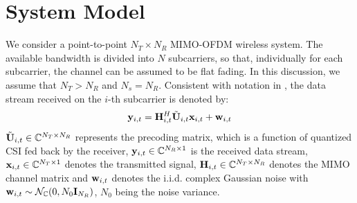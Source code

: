 \documentclass[conference]{IEEEtran}
\begin{document}
\section{System Model}
\label{section2}
\noindent We consider a point-to-point $N_T\times N_R$ MIMO-OFDM wireless system.
The available bandwidth is divided into $N$ subcarriers, so that, individually for each subcarrier, the channel can be assumed to be flat fading. In this discussion, we assume that $N_T > N_R$ and $N_s = N_R$. Consistent with notation in \cite{6891198,Gupt1905:Predictive}, the data stream received on the $i$-th subcarrier is denoted by:
\begin{equation}
{\bf y}_{i,t}={\bf H}^{H}_{i,t}\tilde{{\bf U}}_{i,t}{\bf x}_{i,t}+ {\bf w}_{i,t}
\end{equation}
$\tilde{{\bf U}}_{i,t} \in \mathbb{C}^{N_T \times N_R}$ represents the precoding matrix, which is a function of quantized CSI fed back by the receiver, ${\bf y}_{i,t} \in \mathbb{C}^{N_R \times 1}$ is the received data stream, ${\bf x}_{i,t} \in \mathbb{C}^{N_T \times 1}$ denotes the transmitted signal, ${\bf H}_{i,t} \in \mathbb{C}^{N_T \times N_R}$ denotes the MIMO channel matrix and ${\bf w}_{i,t}$ denotes the i.i.d. complex Gaussian noise with ${\bf w}_{i,t} \sim \mathcal{N}_{\mathbb{C}}(0,N_0{\bf I}_{N_R})$, $N_0$ being the noise variance.

\end{document}
